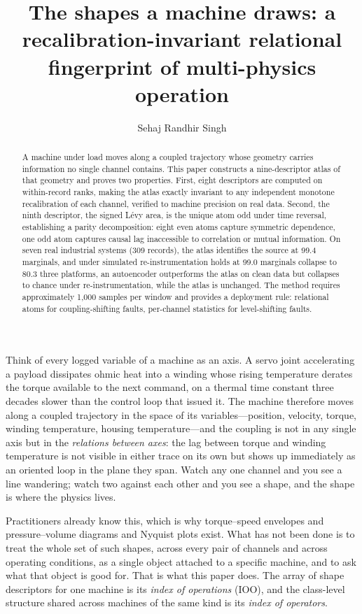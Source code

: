 \documentclass[11pt]{article}
\title{\bf The shapes a machine draws: a recalibration-invariant relational
fingerprint of multi-physics operation}
\author{Sehaj Randhir Singh}
\affil[1]{Department of Electrical and Computer Engineering, NYU Tandon School of Engineering}
\affil[2]{Independent Researcher}
\date{}
\begin{document}
\maketitle

\begin{abstract}
A machine under load moves along a coupled trajectory whose geometry carries
information no single channel contains. This paper constructs a
nine-descriptor atlas of that geometry and proves two properties. First,
eight descriptors are computed on within-record ranks, making the atlas
exactly invariant to any independent monotone recalibration of each
channel, verified to machine precision on real data. Second, the ninth
descriptor, the signed L\'evy area, is the unique atom odd under time
reversal, establishing a parity decomposition: eight even atoms capture
symmetric dependence, one odd atom captures causal lag inaccessible to
correlation or mutual information. On seven real industrial systems (309
records), the atlas identifies the source at 99.4%
marginals, and under simulated re-instrumentation holds at 99.0%
marginals collapse to 80.3%
three platforms, an autoencoder outperforms the atlas on clean data but
collapses to chance under re-instrumentation, while the atlas is unchanged.
The method requires approximately 1,000 samples per window and provides a
deployment rule: relational atoms for coupling-shifting faults, per-channel
statistics for level-shifting faults.
\end{abstract}

Think of every logged variable of a machine as an axis. A servo joint
accelerating a payload dissipates ohmic heat into a winding whose rising
temperature derates the torque available to the next command, on a thermal
time constant three decades slower than the control loop that issued it. The
machine therefore moves along a coupled trajectory in the space of its
variables---position, velocity, torque, winding temperature, housing
temperature---and the coupling is not in any single axis but in the
\emph{relations between axes}: the lag between torque and winding temperature
is not visible in either trace on its own but shows up immediately as an
oriented loop in the plane they span. Watch any one channel and you see a
line wandering; watch two against each other and you see a shape, and the
shape is where the physics lives.

Practitioners already know this, which is why torque--speed envelopes and
pressure--volume diagrams and Nyquist plots exist. What has not been done is to
treat the whole set of such shapes, across every pair of channels and across
operating conditions, as a single object attached to a specific machine, and to
ask what that object is good for. That is what this paper does. The array of
shape descriptors for one machine is its \emph{index of operations} (IOO), and
the class-level structure shared across machines of the same kind is its
\emph{index of operators}.
\end{document}
